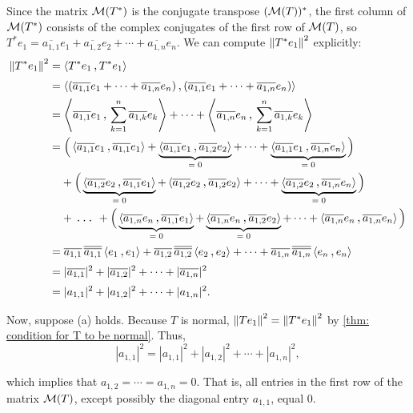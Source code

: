 \begin{prf}
  Since the matrix $\mathcal{M}(T^*)$ is the conjugate transpose $(\mathcal{M}(T))^*$, the first column of $\mathcal{M}(T^*)$ consists of the complex conjugates of the first row of $\mathcal{M}(T)$, so $T^* e_1 = \overline{a_{1,1}} e_1 + \overline{a_{1,2}} e_2 + \cdots + \overline{a_{1,n}} e_n$. We can compute $\left \lVert T^* e_1 \right \rVert^2$ explicitly:
  \[
  \begin{aligned}
    \norm{T^* e_1}^2
    &= \ip{T^* e_1}{T^* e_1} \\
    &= \ip{(\overline{a_{1,1}} e_1 + \cdots + \overline{a_{1,n}} e_n)}{(\overline{a_{1,1}} e_1 + \cdots + \overline{a_{1,n}} e_n)} \\
    &= \ip{\overline{a_{1,1}} e_1}{\sum_{k=1}^n \overline{a_{1,k}} e_k} + \cdots + \ip{\overline{a_{1,n}} e_n}{\sum_{k=1}^n \overline{a_{1,k}} e_k} \\
    &= \Big( \ip{\overline{a_{1,1}} e_1}{\overline{a_{1,1}} e_1} + \underbrace{\ip{\overline{a_{1,1}} e_1}{\overline{a_{1,2}} e_2}}_{= \; 0} + \cdots + \underbrace{\ip{\overline{a_{1,1}} e_1}{\overline{a_{1,n}} e_n}}_{= \; 0} \Big) \\
    &\hphantom{=} \; + \Big( \underbrace{\ip{\overline{a_{1,2}} e_2}{\overline{a_{1,1}} e_1}}_{= \; 0} + \ip{\overline{a_{1,2}} e_2}{\overline{a_{1,2}} e_2} + \cdots + \underbrace{\ip{\overline{a_{1,2}} e_2}{\overline{a_{1,n}} e_n}}_{= \; 0} \Big) \\
    &\hphantom{=} \; + \mathlarger{\ddd} + \Big( \underbrace{\ip{\overline{a_{1,n}} e_n}{\overline{a_{1,1}} e_1}}_{= \; 0} + \underbrace{\ip{\overline{a_{1,n}} e_n}{\overline{a_{1,2}} e_2}}_{= \; 0} + \cdots + \ip{\overline{a_{1,n}} e_n}{\overline{a_{1,n}} e_n} \Big) \\
    &= \overline{a_{1,1}} \, \overline{\overline{a_{1,1}}} \ip{e_1}{e_1} + \overline{a_{1,2}} \, \overline{\overline{a_{1,2}}} \ip{e_2}{e_2} + \cdots + \overline{a_{1,n}} \, \overline{\overline{a_{1,n}}} \ip{e_n}{e_n} \\
    &= |\overline{a_{1,1}}|^2 + |\overline{a_{1,2}}|^2 + \cdots + |\overline{a_{1,n}}|^2 \\
    &= |a_{1,1}|^2 + |a_{1,2}|^2 + \cdots + |a_{1,n}|^2.
  \end{aligned}
  \]

  \StepOne Now, suppose (a) holds. Because $T$ is normal, $\left \lVert T e_1 \right \rVert^2 = \left \lVert T^* e_1 \right \rVert^2$ by \ref{thm: condition for T to be normal}. Thus,
  \[
  |a_{1,1}|^2 = |a_{1,1}|^2 + |a_{1,2}|^2 + \cdots + |a_{1,n}|^2,
  \]

  which implies that $a_{1,2} = \cdots = a_{1,n} = 0$. That is, all entries in the first row of the matrix $\mathcal{M}(T)$, except possibly the diagonal entry $a_{1,1}$, equal $0$.


\end{prf}
